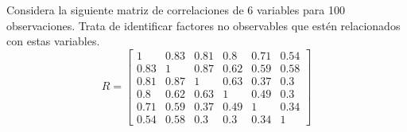 \documentclass[12pt]{article}
\newenvironment{problem}[2][Problema]{\begin{trivlist}
\item[\hskip \labelsep {\bfseries #1}\hskip \labelsep {\bfseries #2.}]}{\end{trivlist}}
\begin{document}

\begin{problem}{1}
Considera la siguiente matriz de correlaciones de 6 variables para 100 observaciones. Trata de identificar factores no observables que estén relacionados con estas variables.
\[
R =
\begin{bmatrix}
1    & 0.83 & 0.81 & 0.8  & 0.71 & 0.54 \\
0.83 & 1    & 0.87 & 0.62 & 0.59 & 0.58 \\
0.81 & 0.87 & 1    & 0.63 & 0.37 & 0.3  \\
0.8  & 0.62 & 0.63 & 1    & 0.49 & 0.3  \\
0.71 & 0.59 & 0.37 & 0.49 & 1    & 0.34 \\
0.54 & 0.58 & 0.3  & 0.3  & 0.34 & 1    
\end{bmatrix}
\]
\end{problem}
\end{document}
